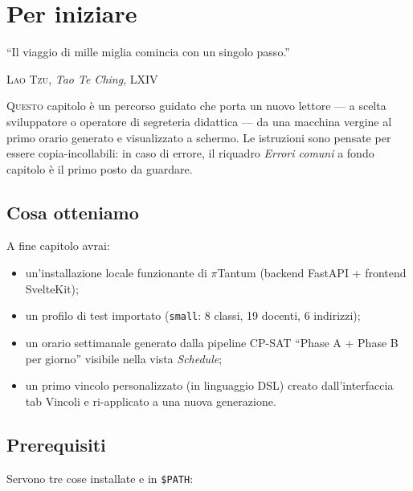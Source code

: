 \chapter{Per iniziare}
\label{ch:getting_started}

\epigraph{``Il viaggio di mille miglia comincia con un singolo
passo.''}{\textsc{Lao Tzu}, \emph{Tao Te Ching}, LXIV}

\lettrine[lines=3]{Q}{uesto} capitolo \`e un percorso guidato che
porta un nuovo lettore --- a scelta sviluppatore o operatore di
segreteria didattica --- da una macchina vergine al primo orario
generato e visualizzato a schermo. Le istruzioni sono pensate per
essere copia-incollabili: in caso di errore, il riquadro
\emph{Errori comuni} a fondo capitolo \`e il primo posto da
guardare.


\section{Cosa otteniamo}

A fine capitolo avrai:
\begin{itemize}
\item un'installazione locale funzionante di $\pi$Tantum (backend
  FastAPI + frontend SvelteKit);
\item un profilo di test importato (\texttt{small}: 8 classi,
  19 docenti, 6 indirizzi);
\item un orario settimanale generato dalla pipeline CP-SAT
  ``Phase A + Phase B per giorno'' visibile nella vista
  \emph{Schedule};
\item un primo vincolo personalizzato (in linguaggio DSL) creato
  dall'interfaccia tab Vincoli e ri-applicato a una nuova
  generazione.
\end{itemize}


\section{Prerequisiti}

Servono tre cose installate e in \texttt{\$PATH}:

